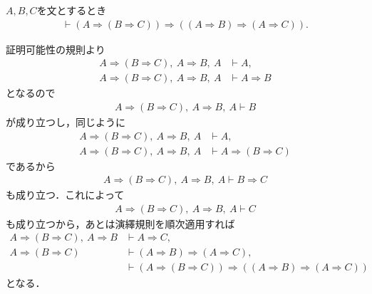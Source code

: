 	\begin{screen}
		\begin{logicalthm}[含意の分配則]
		\label{logicalthm:distributive_law_of_implication}
			$A,B,C$を文とするとき
			\begin{align}
				\vdash (A \Longrightarrow (B \Longrightarrow C)) \Longrightarrow ((A \Longrightarrow B) \Longrightarrow (A \Longrightarrow C)).
			\end{align}
		\end{logicalthm}
	\end{screen}
	
	\begin{prf}
		証明可能性の規則より
		\begin{align}
			A \Longrightarrow (B \Longrightarrow C),\ A \Longrightarrow B,\ A
			&\vdash A, \\
			A \Longrightarrow (B \Longrightarrow C),\ A \Longrightarrow B,\ A
			&\vdash A \Longrightarrow B
		\end{align}
		となるので
		\begin{align}
			A \Longrightarrow (B \Longrightarrow C),\ A \Longrightarrow B,\ A
			\vdash B
		\end{align}
		が成り立つし，同じように
		\begin{align}
			A \Longrightarrow (B \Longrightarrow C),\ A \Longrightarrow B,\ A
			&\vdash A, \\
			A \Longrightarrow (B \Longrightarrow C),\ A \Longrightarrow B,\ A
			&\vdash A \Longrightarrow (B \Longrightarrow C)
		\end{align}
		であるから
		\begin{align}
			A \Longrightarrow (B \Longrightarrow C),\ A \Longrightarrow B,\ A
			\vdash B \Longrightarrow C
		\end{align}
		も成り立つ．これによって
		\begin{align}
			A \Longrightarrow (B \Longrightarrow C),\ A \Longrightarrow B,\ A
			\vdash C
		\end{align}
		も成り立つから，あとは演繹規則を順次適用すれば
		\begin{align}
			A \Longrightarrow (B \Longrightarrow C),\ A \Longrightarrow B
			&\vdash A \Longrightarrow C, \\
			A \Longrightarrow (B \Longrightarrow C)
			&\vdash (A \Longrightarrow B) \Longrightarrow (A \Longrightarrow C), \\
			&\vdash (A \Longrightarrow (B \Longrightarrow C)) \Longrightarrow ((A \Longrightarrow B) \Longrightarrow (A \Longrightarrow C))
		\end{align}
		となる．
		\QED
	\end{prf}
	
